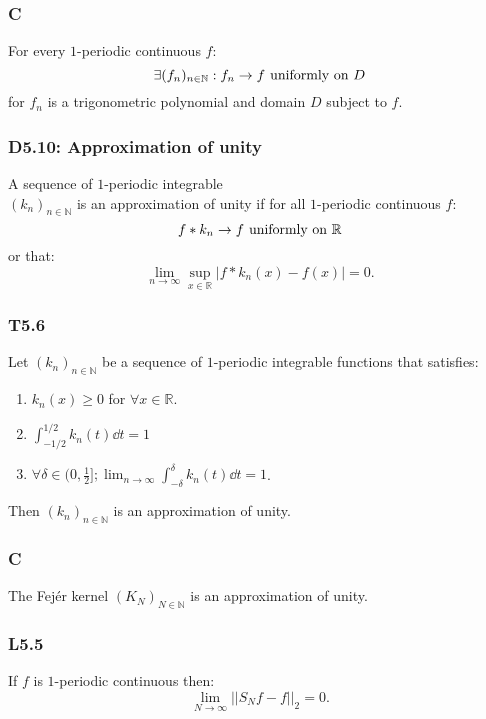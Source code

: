 \documentclass{article}
\begin{document}
\begin{multicols*}{3}
\subsubsection*{C}
For every $1$-periodic continuous $f$:
$$\exists(f_n)_{n\in\mathbb{N}}
:f_n\rightarrow f\hspace{0.05in}\text{uniformly on $D$}$$
for $f_n$ is a trigonometric polynomial
and domain $D$ subject to $f$.

\subsubsection*{D5.10: Approximation of unity}
A sequence of $1$-periodic integrable \\
$(k_n)_{n\in\mathbb{N}}$ is an approximation
of unity if for all $1$-periodic continuous $f$:
$$f*k_n\rightarrow f\hspace{0.05in}
\text{uniformly on $\mathbb{R}$}$$
or that:
$$\lim_{n\rightarrow\infty}
\sup_{x\in\mathbb{R}}
|f*k_n(x)-f(x)|=0.$$

\subsubsection*{T5.6}
Let $(k_n)_{n\in\mathbb{N}}$ be
a sequence of $1$-periodic integrable functions
that satisfies:
\begin{enumerate}
    \item $k_n(x)\geq0$ for $\forall x\in\mathbb{R}$.
    
    \item $\displaystyle
    \int_{-1/2}^{1/2}k_n(t)\dd t=1$

    \item $\forall\delta\in(0,\frac{1}{2}];
    \displaystyle\lim_{n\rightarrow\infty}
    \int_{-\delta}^{\delta}k_n(t)\dd t=1$.
\end{enumerate}
Then $(k_n)_{n\in\mathbb{N}}$
is an approximation of unity.

\subsubsection*{C}
The Fej\'er kernel $(K_N)_{N\in\mathbb{N}}$
is an approximation of unity.

\subsubsection*{L5.5}
If $f$ is $1$-periodic continuous
then:
$$\lim_{N\rightarrow\infty}||S_N f-f||_2=0.$$


\end{multicols*}
\end{document}
